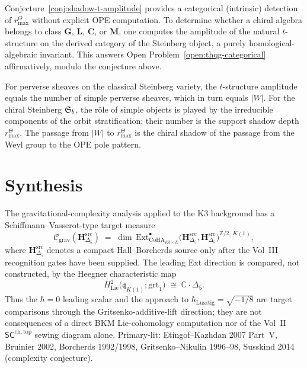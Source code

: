 \begin{remark}
Conjecture~\ref{conj:shadow-t-amplitude} provides a
categorical (intrinsic) detection of \(r^\Theta_{\max}\) without
explicit OPE computation. To determine whether a chiral
algebra belongs to class $\mathbf{G}$, $\mathbf{L}$,
$\mathbf{C}$, or $\mathbf{M}$, one computes the amplitude of the natural
$t$-structure on the derived category of the Steinberg
object, a purely homological-algebraic invariant.
This answers Open Problem~\ref{open:thqg-categorical}
affirmatively, modulo the conjecture above.
\end{remark}

\begin{remark}
For perverse sheaves on the classical Steinberg variety,
the $t$-structure amplitude equals the number of simple
perverse sheaves, which in turn equals $|W|$. For the
chiral Steinberg $\mathfrak{S}_b$, the r\^ole of simple
objects is played by the irreducible components of the
orbit stratification; their number is the support shadow depth
\(r^\Theta_{\max}\). The passage from $|W|$ to
\(r^\Theta_{\max}\) is the
chiral shadow of the passage from the Weyl group to the
OPE pole pattern.
\end{remark}

\section{Synthesis}
\label{sec:gravcomplex-supplement}

\begin{remark}
\label{rem:gravcomplex-1}
The gravitational-complexity analysis applied to the K3 background has
a Schiffmann--Vasserot-type target measure
\[
\mathcal C_{\mathrm{grav}}(\mathbf H_{\Delta_5}^{\mathrm{src}})
\;=\; \dim\, \mathrm{Ext}^\bullet_{\mathrm{CoHA}_{K3\times E}}
\bigl(\mathbf H_{\Delta_5}^{\mathrm{src}}, \mathbf H_{\Delta_5}^{\mathrm{src}}\bigr)^{\mathbb Z/2,\, K(1)},
\]
where $\mathbf H_{\Delta_5}^{\mathrm{src}}$ denotes a compact
Hall--Borcherds source only after the Vol~III recognition gates have
been supplied.  The leading Ext direction is compared, not constructed,
by the Heegner characteristic map
\[
H^2_{\mathrm{Lie}}\bigl(\mathfrak q_{K(1)};\mathrm{grt}_1\bigr)
\;\cong\; \mathbb C\cdot \Delta_5 .
\]
Thus the $\hbar=0$ leading scalar and the approach to
$\hbar_{\mathrm{Lusztig}}=\sqrt{-1/8}$ are target comparisons through
the Gritsenko-additive-lift direction; they are not consequences of a
direct BKM Lie-cohomology computation nor of the Vol~II
$\mathsf{SC}^{\mathrm{ch,top}}$ sewing diagram alone.  Primary-lit:
Etingof--Kazhdan 2007 Part~V, Bruinier 2002, Borcherds 1992/1998,
Gritsenko--Nikulin 1996--98, Susskind 2014 (complexity conjecture).
\end{remark}
